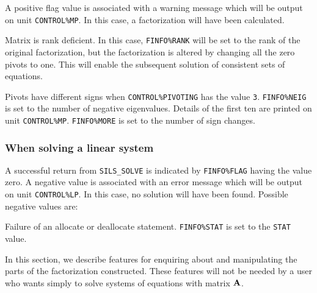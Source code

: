 \documentclass{galahad}
\newcommand{\packagename}{SILS}
\begin{document}
A positive flag value is associated with a warning message 
 which will  be output on unit {\tt CONTROL\%MP}. In this case, a 
 factorization will have been calculated. 
 
\begin{description} 
 Matrix is rank deficient.  In this case, {\tt FINFO\%RANK} will be 
set to the rank of the original factorization, but the factorization is 
altered by changing all the zero pivots to one. This will enable the 
subsequent solution of consistent sets of equations. 
 
 Pivots have different signs when {\tt CONTROL\%PIVOTING} has the value 
 {\tt 3}. 
 {\tt FINFO\%NEIG} is set to the number of negative eigenvalues. 
 Details of the first ten are printed on unit {\tt CONTROL\%MP}. 
       {\tt FINFO\%MORE} is set to the number of sign changes. 
 
\end{description} 
 

\subsubsection{When solving a linear system}\label{errorsolve}
A successful return from {\tt \packagename\_SOLVE} is indicated by 
 {\tt FINFO\%FLAG} having the value zero.  A negative value is 
 associated with an error message which will  be output on unit 
 {\tt CONTROL\%LP}. In this case, no solution will have been 
 found.  Possible negative values are: 
 
 
\begin{description} 
 Failure of an allocate or deallocate statement. {\tt FINFO\%STAT} 
 is set to the {\tt STAT} value.  
\end{description} 
 

\galfeatures
\noindent In this section, we describe features for enquiring about and 
manipulating the parts of the factorization constructed. These features 
will not be needed by a user who wants simply to solve systems of 
equations with matrix ${\mathbf{A}}$. 
\end{document}
